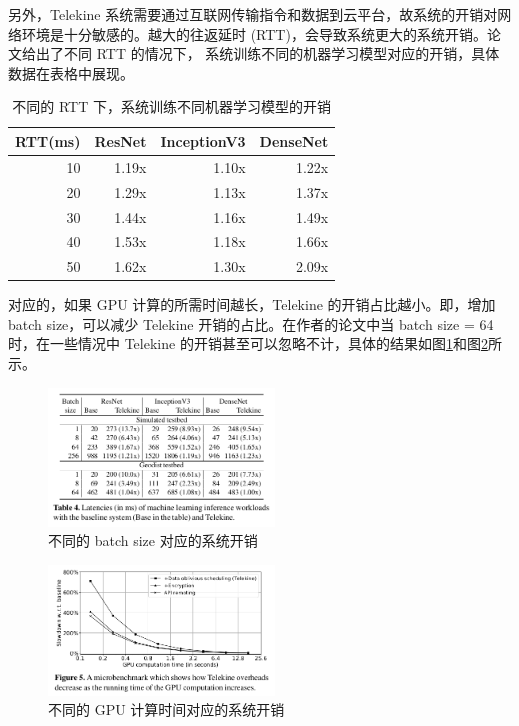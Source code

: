 \documentclass{ctexart}
\begin{document}
另外，Telekine 系统需要通过互联网传输指令和数据到云平台，故系统的开销对网络环境是十分敏感的。越大的往返延时 (RTT)，会导致系统更大的系统开销。论文给出了不同 RTT 的情况下， 系统训练不同的机器学习模型对应的开销，具体数据在表格中展现。

\begin{table}
    \caption{不同的 RTT 下，系统训练不同机器学习模型的开销}
    \label{tbl: overhead with RTTs}
    \centering
    \begin{tabular}{r|rrr}
        \hline
        RTT(ms) & ResNet & InceptionV3 & DenseNet \\
        \hline
        10 & 1.19x & 1.10x & 1.22x \\
        20 & 1.29x & 1.13x & 1.37x \\
        30 & 1.44x & 1.16x & 1.49x \\
        40 & 1.53x & 1.18x & 1.66x \\
        50 & 1.62x & 1.30x & 2.09x \\
        \hline
    \end{tabular}
\end{table}

对应的，如果 GPU 计算的所需时间越长，Telekine 的开销占比越小。即，增加 batch size，可以减少 Telekine 开销的占比。在作者的论文中当 batch size = 64 时，在一些情况中 Telekine 的开销甚至可以忽略不计，具体的结果如图\ref{tbl: batch-size}和图\ref{fig: GPU-comp-time}所示。

\begin{figure}
    \centering
    \includegraphics[width=6cm]{images/batch-size-overhead-tbl.png}
    \caption{不同的 batch size 对应的系统开销}
    \label{tbl: batch-size}
\end{figure}
\begin{figure}
    \centering
    \includegraphics[width=6cm]{images/GPU-comp-time-plot.png}
    \caption{不同的 GPU 计算时间对应的系统开销}
    \label{fig: GPU-comp-time}
\end{figure}
\end{document}
